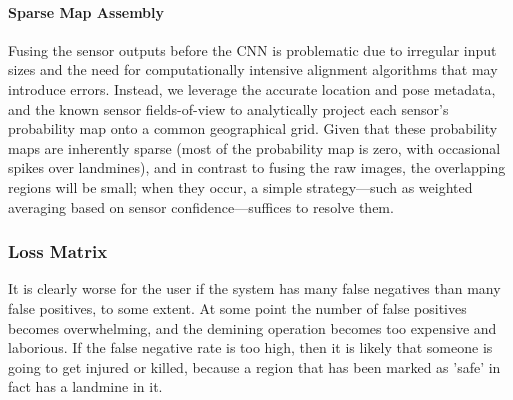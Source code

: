     \paragraph{Sparse Map Assembly}
        
        Fusing the sensor outputs before the CNN is problematic due to irregular input sizes and the need for computationally intensive alignment algorithms that may introduce errors. Instead, we leverage the accurate location and pose metadata, and the known sensor fields-of-view to analytically project each sensor’s probability map onto a common geographical grid. Given that these probability maps are inherently sparse (most of the probability map is zero, with occasional spikes over landmines), and in contrast to fusing the raw images, the overlapping regions will be small; when they occur, a simple strategy—such as weighted averaging based on sensor confidence—suffices to resolve them.

    
    \subsubsection{Loss Matrix} \label{lossmatrix}
        
        It is clearly worse for the user if the system has many false negatives than many false positives, to some extent. At some point the number of false positives becomes overwhelming, and the demining operation becomes too expensive and laborious. If the false negative rate is too high, then it is likely that someone is going to get injured or killed, because a region that has been marked as 'safe' in fact has a landmine in it.
